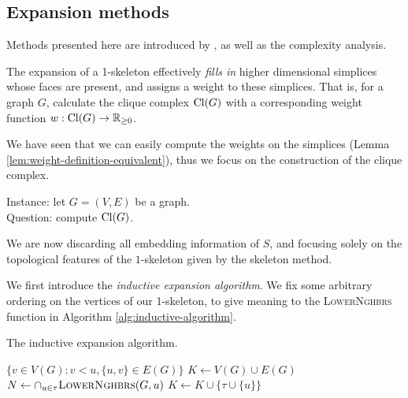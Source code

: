 \subsection{Expansion methods}

Methods presented here are introduced by \textcite{zomorodian2010fast}, as well as the complexity analysis. 

The expansion of a 1-skeleton effectively \emph{fills in} higher dimensional simplices whose faces are present, and assigns a weight to these simplices. That is, for a graph $G$, calculate the clique complex $\operatorname{Cl}(G)$ with a corresponding weight function $w: \operatorname{Cl}(G) \to \mathbb R_{\geq 0}$. 

We have seen that we can easily compute the weights on the simplices (Lemma \ref{lem:weight-definition-equivalent}), thus we focus on the construction of the clique complex.

\begin{problem}[CliqueComplex]
    Instance: let $G = (V,E)$ be a graph. \\
    Question: compute $\operatorname{Cl}(G)$. 
\end{problem}

We are now discarding all embedding information of $S$, and focusing solely on the topological features of the $1$-skeleton given by the skeleton method. 

We first introduce the \emph{inductive expansion algorithm}. We fix some arbitrary ordering on the vertices of our 1-skeleton, to give meaning to the \textsc{LowerNghbrs} function in Algorithm \ref{alg:inductive-algorithm}.

\begin{algorithm}
    \caption{The inductive expansion algorithm.}
    \label{alg:inductive-algorithm}
    \begin{algorithmic}
        \State \Return $\{v \in V(G): v < u, \{u,v\} \in E(G)\}$
        \EndFunction
        \State $K \gets V(G) \cup E(G)$
        \State $N \gets \cap_{u \in \tau} \textsc{LowerNghbrs}(G, u)$
        \State $K \gets K \cup \{\tau \cup \{u\}\}$
        \EndFor
        \EndFor
        \EndFor
        \EndFunction
    \end{algorithmic}
\end{algorithm}

